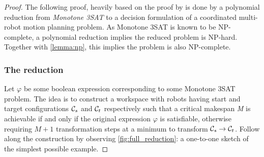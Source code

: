 \begin{proof}
	The following proof, heavily based on the proof by \cite{siamcomp/DemaineFKMS19} is done by a polynomial reduction from \emph{Monotone 3SAT} to a decision formulation of a coordinated multi-robot motion planning problem. 
	As Monotone 3SAT is known to be NP-complete, a polynomial reduction implies the reduced problem is NP-hard. 
	Together with \cref{lemma:np}, this implies the problem is also NP-complete. 






	\subsubsection*{The reduction} 
	Let \(\varphi\) be some boolean expression corresponding to some Monotone 3SAT problem. 
	The idea is to construct a workspace with robots having start and target configurations \(\mathcal{C}_{s}\) and \(\mathcal{C}_{t}\) respectively such that a critical makespan \emph{M} is achievable if and only if the original expression \(\varphi\) is satisfiable, otherwise requiring \(M + 1\) transformation steps at a minimum to transform \(\mathcal{C}_{s} \rightarrow \mathcal{C}_{t}\). 
	Follow along the construction by observing \cref{fig:full_reduction}: a one-to-one sketch of the simplest possible example. 






\end{proof}
